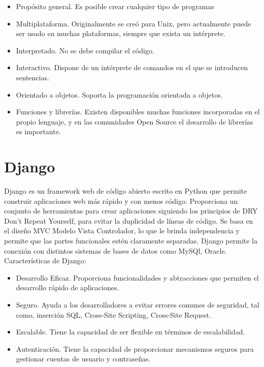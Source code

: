 \documentclass[a4paper, 12pt]{book}
\begin{document}
\begin{itemize}
  \item Propósito general. Es posible crear cualquier tipo de programas
  \item Multiplataforma. Originalmente se creó para Unix, pero actualmente puede ser usado en
	muchas plataformas, siempre que exista un intérprete.
	\item Interpretado. No se debe compilar el código.
	\item Interactivo. Dispone de un intérprete de comandos en el que se introducen sentencias.
	\item Orientado a objetos. Soporta la programación orientada a objetos.
	\item Funciones y librerías. Existen disponibles muchas funciones incorporadas en el propio 
	lenguaje, y en las comunidades Open Source el desarrollo de librerías es importante.
\end{itemize}

\section{Django}
\label{sec:seccion5}

Django es un framework web de código abierto escrito en Python que permite construir aplicaciones
web más rápido y con menos código. Proporciona un conjunto de herramientas para crear aplicaciones
siguiendo los principios de DRY Don't Repeat Yourself, para evitar la duplicidad de líneas de código.
Se basa en el diseño MVC Modelo Vista Controlador, lo que le brinda independencia y permite que
las partes funcionales estén claramente separadas.
Django permite la conexión con distintos sistemas de bases de datos como MySQl, Oracle. \\

Características de Django:

\begin{itemize}
  \item Desarrollo Eficaz. Proporciona funcionalidades y abtracciones que permiten el desarrollo
	rápido de aplicaciones.
  \item Seguro. Ayuda a los desarrolladores a evitar errores comunes de seguridad, tal como, inserción 
	SQL, Cross-Site Scripting, Cross-Site Request.
	\item Escalable. Tiene la capacidad de ser flexible en términos de escalabilidad.
	\item Autenticación. Tiene la capacidad de proporcionar mecanismos seguros para gestionar cuentas
	de usuario y contraseñas.
\end{itemize}
\end{document}
